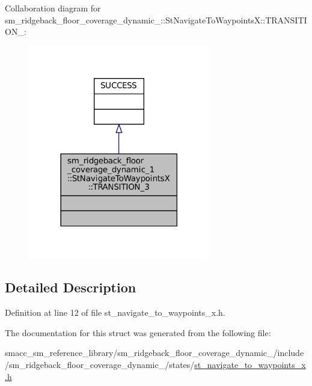 Collaboration diagram for sm\+\_\+ridgeback\+\_\+floor\+\_\+coverage\+\_\+dynamic\+\_\+:\+:St\+Navigate\+To\+WaypointsX\+:\+:T\+R\+A\+N\+S\+I\+T\+I\+O\+N\+\_\+:
\nopagebreak
\begin{figure}[H]
\begin{center}
\leavevmode
\includegraphics[width=225pt]{structsm__ridgeback__floor__coverage__dynamic__1_1_1StNavigateToWaypointsX_1_1TRANSITION__3__coll__graph}
\end{center}
\end{figure}


\subsection{Detailed Description}


Definition at line 12 of file st\+\_\+navigate\+\_\+to\+\_\+waypoints\+\_\+x.\+h.



The documentation for this struct was generated from the following file\+:\begin{DoxyCompactItemize}
\item 
smacc\+\_\+sm\+\_\+reference\+\_\+library/sm\+\_\+ridgeback\+\_\+floor\+\_\+coverage\+\_\+dynamic\+\_/include/sm\+\_\+ridgeback\+\_\+floor\+\_\+coverage\+\_\+dynamic\+\_/states/\hyperlink{sm__ridgeback__floor__coverage__dynamic__1_2include_2sm__ridgeback__floor__coverage__dynamic__1_3fed5e8ad7de3a7070c001932f8560e3}{st\+\_\+navigate\+\_\+to\+\_\+waypoints\+\_\+x.\+h}\end{DoxyCompactItemize}
